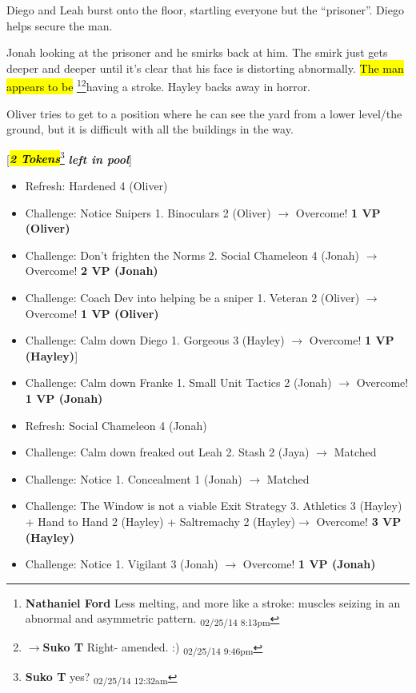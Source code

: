 Diego and Leah burst onto the floor, startling everyone but the ``prisoner''.  Diego helps secure the man.



Jonah looking at the prisoner and he smirks back at him.  The smirk just gets deeper and deeper until it's clear that his face is distorting abnormally.  \hl{The man appears to be }\footnote{\textbf{Nathaniel Ford }Less melting, and more like a stroke: muscles seizing in an abnormal and asymmetric pattern. \textsubscript{02/25/14 8:13pm}}\footnote{$\rightarrow$\textbf{Suko T }Right- amended. :) \textsubscript{02/25/14 9:46pm}}having a stroke.  Hayley backs away in horror.



Oliver tries to get to a position where he can see the yard from a lower level/the ground, but it is difficult with all the buildings in the way.



{[}\textit{\textbf{\hl{2 Tokens}}}\footnote{\textbf{Suko T }yes? \textsubscript{02/25/14 12:32am}}\textit{\textbf{ left in pool}}{]}








\begin{itemize}[noitemsep,topsep=0pt]
\item Refresh: Hardened 4 (Oliver)
\item Challenge: Notice Snipers 1. Binoculars 2 (Oliver) $\rightarrow$ Overcome! \textbf{1 VP (Oliver)}
\item Challenge: Don't frighten the Norms 2.  Social Chameleon 4 (Jonah) $\rightarrow$ Overcome! \textbf{2 VP (Jonah)}
\item Challenge: Coach Dev into helping be a sniper 1. Veteran 2 (Oliver) $\rightarrow$ Overcome! \textbf{1 VP (Oliver)}
\item Challenge: Calm down Diego 1. Gorgeous 3 (Hayley) $\rightarrow$ Overcome! \textbf{1 VP (Hayley)}{]} 
\item Challenge: Calm down Franke 1. Small Unit Tactics 2 (Jonah) $\rightarrow$ Overcome! \textbf{1 VP (Jonah)}
\item Refresh: Social Chameleon 4 (Jonah)
\item Challenge: Calm down freaked out Leah 2. Stash 2 (Jaya) $\rightarrow$  Matched
\item Challenge: Notice 1. Concealment 1 (Jonah) $\rightarrow$ Matched
\item Challenge: The Window is not a viable Exit Strategy 3. Athletics 3 (Hayley) + Hand to Hand 2 (Hayley) + Saltremachy 2 (Hayley)$\rightarrow$ Overcome! \textbf{3 VP (Hayley)}
\item Challenge: Notice 1. Vigilant 3 (Jonah)  $\rightarrow$ Overcome! \textbf{1 VP (Jonah)}
\end{itemize}





